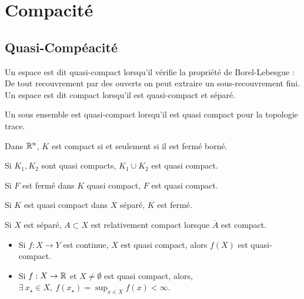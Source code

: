 \documentclass{cours}
\begin{document}
\newpage
\section{Compacité}
\subsection{Quasi-Compéacité}
\begin{definition}
    Un espace est dit quasi-compact lorsqu'il vérifie la propriété de Borel-Lebesgue : De tout recouvrement par des ouverts on peut  extraire un sous-recouvrement fini. Un espace est dit compact lorsqu'il est quasi-compact et séparé.
\end{definition}

\begin{definition}
    Un sous ensemble est quasi-compact lorsqu'il est quasi compact pour la topologie trace.
\end{definition}

\begin{proposition}
    \item Dans $\mathbb{R}^{n}$, $K$ est compact si et seulement si il est fermé borné.
    \item Si $K_{1}, K_{2}$ sont quasi compacts, $K_{1} \cup K_{2}$ est quasi compact.
\end{proposition}

\begin{theorem}
    \item Si $F$ est fermé dans $K$ quasi compact, $F$ est quasi compact.
    \item Si $K$ est quasi compact dans $X$ séparé, $K$ est fermé.
\end{theorem}

\begin{definition}
    Si $X$ est séparé, $A \subset X$ est relativement compact lorsque $\overline{A}$ est compact.
\end{definition}

\begin{theorem}
    \begin{itemize}
        \item Si $f : X \rightarrow Y$ est continue, $X$ est quasi compact, alors $f(X)$ est quasi-compact.
        \item Si $f : X \rightarrow \mathbb{R}$ et $X \neq \emptyset$ est quasi compact, alors, $\exists\ x_{\star} \in X,\ f(x_{\star}) = \sup_{x \in X}f(x) < \infty$.
    \end{itemize}
\end{theorem}
\end{document}
